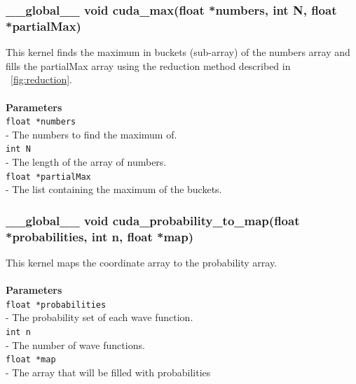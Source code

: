 \documentclass[a4paper, 10pt]{article}
\def\mar{\hspace*{5mm}}
\begin{document}
        \subsubsection{\_\_global\_\_ void cuda\_max(float *numbers, int N, float *partialMax)}
        This kernel finds the maximum in buckets (sub-array) of the numbers array and
        fills the partialMax array using the reduction method described in ~\ref{fig:reduction}.
        \\\\{\bf Parameters}\\
        \verb|float *numbers|\\\mar- The numbers to find the maximum of.\\
        \verb|int N|\\\mar- The length of the array of numbers.\\
        \verb|float *partialMax|\\\mar- The list containing the maximum of the buckets.

        \vspace{1cm}
        \subsubsection{\_\_global\_\_ void cuda\_probability\_to\_map(float *probabilities, int n,
        float *map)}
        This kernel maps the coordinate array to the probability array.\\
        \\{\bf Parameters}\\
        \verb|float *probabilities|\\\mar- The probability set of each wave function.\\
        \verb|int n|\\\mar- The number of wave functions.\\
        \verb|float *map|\\\mar- The array that will be filled with probabilities

        \vspace{1cm}
\end{document}
